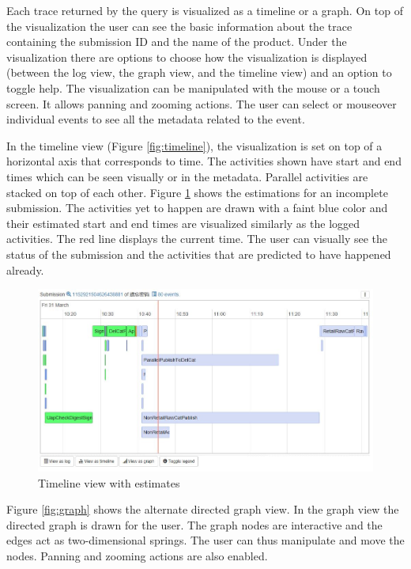 Each trace returned by the query is visualized as a timeline or a graph. On top of the visualization the user can see the basic information about the trace containing the submission ID and the name of the product.
Under the visualization there are options to choose how the visualization is displayed (between the log view, the graph view, and the timeline view) and an option to toggle help.
The visualization can be manipulated with the mouse or a touch screen. It allows panning and zooming actions.
The user can select or mouseover individual events to see all the metadata related to the event.

In the timeline view (Figure \ref{fig:timeline}), the visualization is set on top of a horizontal axis that corresponds to time. The activities shown have start and end times which can be seen visually or in the metadata.
Parallel activities are stacked on top of each other.
Figure \ref{fig:estimates} shows the estimations for an incomplete submission.
The activities yet to happen are drawn with a faint blue color and their estimated start and end times are visualized similarly as the logged activities.
The red line displays the current time.
The user can visually see the status of the submission and the activities that are predicted to have happened already.

\begin{figure}[htb]
\centering \includegraphics[width=\linewidth]{gfx/screenshots/estimates.jpg}
\caption{Timeline view with estimates \label{fig:estimates}}
\end{figure}

Figure \ref{fig:graph} shows the alternate directed graph view. In the graph view the directed graph is drawn for the user. The graph nodes are interactive and the edges act as two-dimensional springs.
The user can thus manipulate and move the nodes. Panning and zooming actions are also enabled.

